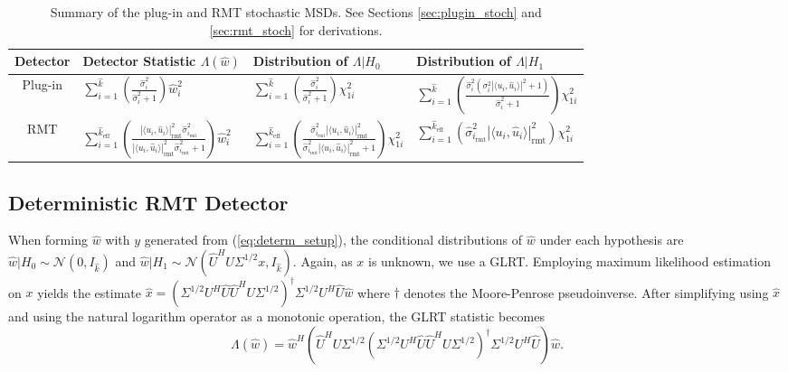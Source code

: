 \begin{table*}[ht!]
\centering
\begin{tabular}{clll}\toprule
 Detector & Detector Statistic $\Lambda(\widehat{w})$  & Distribution  of $\Lambda|H_0$ & Distribution of $\Lambda|H_1$\\
\midrule
Plug-in & $\sum_{i=1}^{\widehat{k}}\left(\frac{\widehat{\sigma}_i^2}{\widehat{\sigma}_i^2+1}\right)\widehat{w}_i^2$ & $\sum_{i=1}^{\widehat{k}}\left(\frac{\widehat{\sigma}_i^2}{\widehat{\sigma}_i^2+1}\right)\chi^2_{1i}$ & $\sum_{i=1}^{\widehat{k}}\left(\frac{\widehat{\sigma}_i^2\left(\sigma^2_i|\langle u_i,\widehat{u}_i\rangle|^2+1\right)}{\widehat{\sigma}_i^2+1}\right)\chi^2_{1i}$\\
 RMT & $\sum_{i=1}^{\widehat{k}_{\text{eff}}}\left(\frac{|\langle u_i,\widehat{u}_i\rangle|^2_{\text{rmt}}\widehat{\sigma}_{i_\text{rmt}}^2}{|\langle u_i,\widehat{u}_i\rangle|^2_{\text{rmt}}\widehat{\sigma}_{i_\text{rmt}}^2+1 }\right)\widehat{w}_i^2$ & $\sum_{i=1}^{\widehat{k}_{\text{eff}}}\left(\frac{\widehat{\sigma}_{i_\text{rmt}}^2|\langle u_i,\widehat{u}_i\rangle|^2_{\text{rmt}}}{\widehat{\sigma}_{i_\text{rmt}}^2|\langle u_i,\widehat{u}_i\rangle|^2_{\text{rmt}}+1}\right)\chi^2_{1i}$ & $\sum_{i=1}^{\widehat{k}_{\text{eff}}}\left(\widehat{\sigma}^2_{i_\text{rmt}}|\langle u_i,\widehat{u}_i\rangle|^2_{\text{rmt}}\right)\chi^2_{1i}$\\
\bottomrule
\end{tabular}
\caption{Summary of the plug-in and RMT stochastic MSDs. See Sections \ref{sec:plugin_stoch} and \ref{sec:rmt_stoch} for derivations.}\vskip-0.2cm
\label{table:summary_stoch}
\vspace{-0.1in}
\end{table*}

\subsection{Deterministic RMT Detector}\label{sec:rmt_detec_determ}

When forming $\widehat{w}$ with $y$ generated from (\ref{eq:determ_setup}), the conditional distributions of $\widehat{w}$ under each hypothesis are $\widehat{w}|H_0\sim\mathcal{N}(0,I_{\widehat{k}})$ and $\widehat{w}|H_1\sim\mathcal{N}(\widehat{U}^HU\Sigma^{1/2} x, I_{\widehat{k}})$. Again, as $x$ is unknown, we use a GLRT. Employing maximum likelihood estimation on $x$ yields the estimate $\widehat{x}=\left(\Sigma^{1/2} U^H\widehat{U}\widehat{U}^HU\Sigma^{1/2}\right)^{\dagger}\Sigma^{1/2} U^H\widehat{U}\widehat{w}$ where $\dagger$ denotes the Moore-Penrose pseudoinverse. After simplifying using $\widehat{x}$ and using the natural logarithm operator as a monotonic operation, the GLRT statistic becomes
\begin{equation*}
\Lambda(\widehat{w}) = \widehat{w}^H\left(\widehat{U}^HU\Sigma^{1/2}\left(\Sigma^{1/2} U^H\widehat{U}\widehat{U}^HU\Sigma^{1/2}\right)^{\dagger}\Sigma^{1/2} U^H\widehat{U}\right)\widehat{w}.
\end{equation*}

